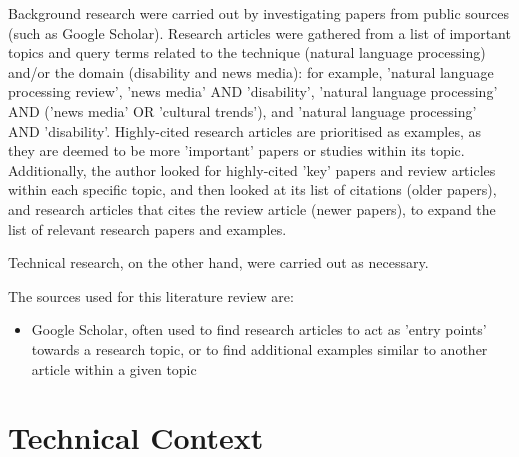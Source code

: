 \documentclass{report}
\begin{document}
Background research were carried out by investigating papers from public sources (such as Google Scholar).
Research articles were gathered from a list of important topics and query terms related to the technique (natural language processing) and/or the domain (disability and news media): for example, 'natural language processing review', 'news media' AND 'disability', 'natural language processing' AND ('news media' OR 'cultural trends'), and 'natural language processing' AND 'disability'.
Highly-cited research articles are prioritised as examples, as they are deemed to be more 'important' papers or studies within its topic.
Additionally, the author looked for highly-cited 'key' papers and review articles within each specific topic, and then looked at its list of citations (older papers), and research articles that cites the review article (newer papers), to expand the list of relevant research papers and examples.

Technical research, on the other hand, were carried out as necessary.  %

The sources used for this literature review are:
\begin{itemize}
	\item Google Scholar, often used to find research articles to act as 'entry points' towards a research topic, or to find additional examples similar to another article within a given topic
\end{itemize}

\section{Technical Context}  %
\end{document}
